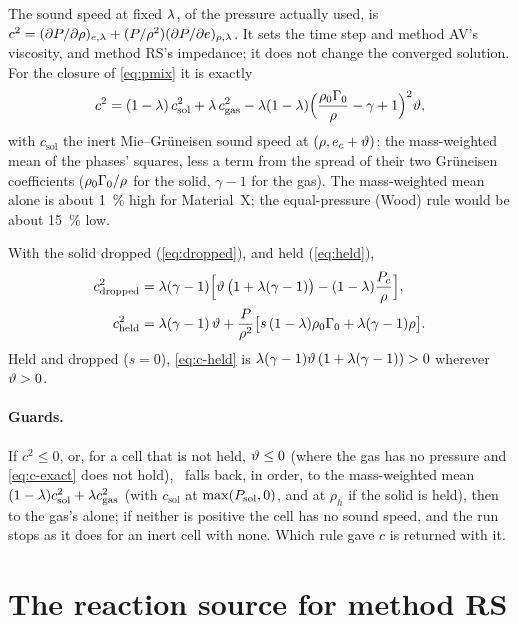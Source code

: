 The sound speed at fixed $\lambda$, of the pressure actually used, is
$c^2 = (\partial P/\partial\rho)_{e,\lambda} + (P/\rho^2)(\partial P/\partial
e)_{\rho,\lambda}$. It sets the time step and method AV's viscosity, and method
RS's impedance; it does not change the converged solution. For the closure
of \cref{eq:pmix} it is exactly
\begin{equation}
  c^2 = (1 - \lambda)\,c_{\mathrm{sol}}^2 + \lambda\,c_{\mathrm{gas}}^2
        - \lambda(1 - \lambda)\Bigl(\frac{\rho_0\Gamma_0}{\rho} - \gamma + 1\Bigr)^{2}\vartheta,
  \label{eq:c-exact}
\end{equation}
with $c_{\mathrm{sol}}$ the inert Mie--Gr\"uneisen sound speed at $(\rho,
e_c + \vartheta)$: the mass-weighted mean of the phases' squares, less a term
from the spread of their two Gr\"uneisen coefficients ($\rho_0\Gamma_0/\rho$ for
the solid, $\gamma - 1$ for the gas). The mass-weighted mean alone is about
1~\% high for Material~X; the equal-pressure (Wood) rule would be about
15~\% low.

With the solid dropped (\cref{eq:dropped}), and held (\cref{eq:held}),
\begin{align}
  c^2_{\mathrm{dropped}} &= \lambda(\gamma - 1)\Bigl[\vartheta\,\bigl(1 + \lambda(\gamma - 1)\bigr)
     - (1 - \lambda)\frac{P_{c}}{\rho}\Bigr],
  \label{eq:c-dropped}\\
  c^2_{\mathrm{held}} &= \lambda(\gamma - 1)\,\vartheta
     + \frac{P}{\rho^2}\bigl[s\,(1 - \lambda)\rho_0\Gamma_0 + \lambda(\gamma - 1)\rho\bigr].
  \label{eq:c-held}
\end{align}
Held and dropped ($s = 0$), \cref{eq:c-held} is $\lambda(\gamma-1)\vartheta\,(1 +
\lambda(\gamma - 1)) > 0$ wherever $\vartheta > 0$.

\paragraph{Guards.} If $c^2 \le 0$, or, for a cell that is not held,
$\vartheta \le 0$ (where the gas has no pressure and \cref{eq:c-exact} does not
hold), \bw\ falls back, in order, to the mass-weighted mean $(1 -
\lambda)c_{\mathrm{sol}}^2 + \lambda c_{\mathrm{gas}}^2$ (with $c_{\mathrm{sol}}$
at $\max(P_{\mathrm{sol}}, 0)$, and at $\rho_h$ if the solid is held), then to the gas's
alone; if neither is positive the cell has no sound speed, and the run
stops as it does for an inert cell with none. Which rule gave $c$ is
returned with it.

\section{The reaction source for method RS}
\label{sec:rs-source}

